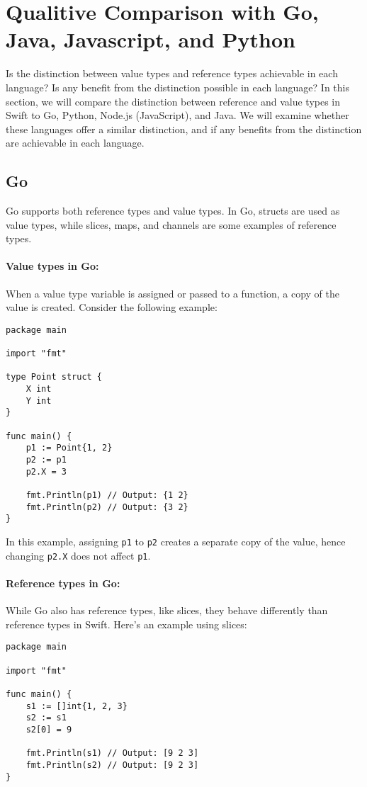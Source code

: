 \section{Qualitive Comparison with Go, Java, Javascript, and Python}
Is the distinction between value types and reference types achievable in each language? Is any benefit from the distinction possible in each language? 
In this section, we will compare the distinction between reference and value types in Swift to Go, Python, Node.js (JavaScript), and Java. We will examine whether these languages offer a similar distinction, and if any benefits from the distinction are achievable in each language.

\subsection{Go}

Go supports both reference types and value types. In Go, structs are used as value types, while slices, maps, and channels are some examples of reference types.

\paragraph{Value types in Go:}
When a value type variable is assigned or passed to a function, a copy of the value is created. Consider the following example:

\begin{verbatim}
package main

import "fmt"

type Point struct {
	X int
	Y int
}

func main() {
	p1 := Point{1, 2}
	p2 := p1
	p2.X = 3

	fmt.Println(p1) // Output: {1 2}
	fmt.Println(p2) // Output: {3 2}
}
\end{verbatim}

In this example, assigning \texttt{p1} to \texttt{p2} creates a separate copy of the value, hence changing \texttt{p2.X} does not affect \texttt{p1}.

\paragraph{Reference types in Go:}
While Go also has reference types, like slices, they behave differently than reference types in Swift. Here's an example using slices:

\begin{verbatim}
package main

import "fmt"

func main() {
	s1 := []int{1, 2, 3}
	s2 := s1
	s2[0] = 9

	fmt.Println(s1) // Output: [9 2 3]
	fmt.Println(s2) // Output: [9 2 3]
}
\end{verbatim}

